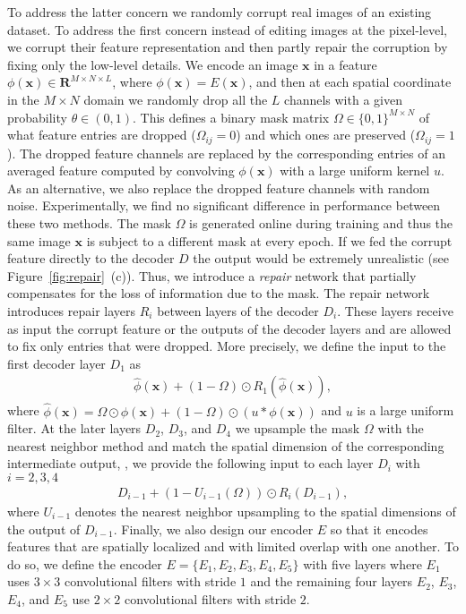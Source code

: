 \documentclass[10pt,twocolumn,letterpaper]{article}
\begin{document}
To address the latter concern we randomly corrupt real images of an existing dataset. To address the first concern instead of editing images at the pixel-level, we corrupt their feature representation and then partly repair the corruption by fixing only the low-level details.
We encode an image $\mathbf{x}$ in a feature $\phi(\mathbf{x})\in \mathbf{R}^{M\times N \times L}$, where $\phi(\mathbf{x}) = E(\mathbf{x})$, and then at each spatial coordinate in the $M\times N$ domain we randomly drop all the $L$ channels with a given probability $\theta\in(0,1)$. This defines a binary mask matrix $\Omega\in \{0,1\}^{M\times N}$ of what feature entries are dropped ($\Omega_{ij}=0$) and which ones are preserved ($\Omega_{ij}=1$). 
The dropped feature channels are replaced by the corresponding entries of an averaged feature computed by convolving $\phi(\mathbf{x})$ with a large uniform kernel $u$. As an alternative, we also replace the dropped feature channels with random noise. Experimentally, we find no significant difference in performance between these two methods.
The mask $\Omega$ is generated online during training and thus the same image $\mathbf{x}$ is subject to a different mask at every epoch.
If we fed the corrupt feature directly to the decoder $D$ the output would be extremely unrealistic (see Figure~\ref{fig:repair}~(c)). Thus, we introduce a \emph{repair} network that partially compensates for the loss of information due to the mask. The repair network introduces repair layers $R_i$ between layers of the decoder $D_i$. These layers receive as input the corrupt feature or the outputs of the decoder layers and are allowed to fix only entries that were dropped. More precisely, we define the input to the first decoder layer $D_1$ as 
\begin{align}
\hat \phi(\mathbf{x}) + (1-\Omega)\odot R_1(\hat \phi(\mathbf{x})),
\end{align}
where $\hat \phi(\mathbf{x}) = \Omega \odot \phi(\mathbf{x}) + (1-\Omega) \odot (u\ast \phi(\mathbf{x}))$ and $u$ is a large uniform filter.
At the later layers $D_2$, $D_3$, and $D_4$ we upsample the mask $\Omega$ with the nearest neighbor method and match the spatial dimension of the corresponding intermediate output, \ie, we provide the following input to each layer $D_i$ with $i=2,3,4$
\begin{align}
D_{i-1} + (1-U_{i-1}(\Omega))\odot R_i(D_{i-1}),
\end{align}
where $U_{i-1}$ denotes the nearest neighbor upsampling to the spatial dimensions of the output of $D_{i-1}$.
Finally, we also design our encoder $E$ so that it encodes features that are spatially localized and with limited overlap with one another. To do so, we define the encoder $E = \{E_1,E_2,E_3,E_4,E_5\}$ with five layers where $E_1$ uses $3\times 3$ convolutional filters with stride $1$ and the remaining four layers $E_2$, $E_3$, $E_4$, and $E_5$ use $2\times 2$ convolutional filters with stride $2$.
\end{document}

